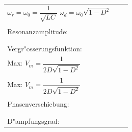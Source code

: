 \begin{tabular}{|p{4cm}|p{7cm}|p{7cm}|}
\begin{minipage}[]{7cm}
\vspace{0.1cm}
$\omega_r=\omega_0=\dfrac{1}{\sqrt{LC}}$ \qquad
$\omega_d=\omega_0\sqrt{1-D^2}
$ \end{minipage}
&
\begin{minipage}[]{7cm}
\vspace{0.2cm}
$\omega_r=\omega_0=\dfrac{1}{\sqrt{LC}}$\\
\end{minipage}\\
\hline
Resonanzamplitude: &
\begin{minipage}[]{7cm}
\vspace{0.1cm}
$I_{0_r}=\dfrac{U_0}{R_S}$\\
\end{minipage}&
\begin{minipage}[]{7cm}
\vspace{0.2cm}
$U_{0_r}=I_0\cdot R_P\qquad$ mit $ R_P =\dfrac{\omega^2\,L^2}{R_S}$\\
\end{minipage}\\
\hline
Vergr"osserungsfunktion: &
\begin{minipage}[]{7cm}
\vspace{0.1cm}
$V(\eta)=\dfrac{\eta^2}{\sqrt{(1-\eta^2)^2+(2D\,\eta)^2}}$\\ Max:
$V_m=\dfrac{1}{2D\sqrt{1-D^2}}$\\
\end{minipage} &
\begin{minipage}[]{7cm}
\vspace{0.2cm}
$V(\eta)=\dfrac{1}{\sqrt{(1-\eta^2)^2+(2D\,\eta)^2}}$\\
Max: $V_m=\dfrac{1}{2D\sqrt{1-D^2}}$\\
\end{minipage}\\
\hline
Phasenverschiebung: &
\begin{minipage}[]{7cm}
\vspace{0.1cm}
$\varphi_{_U}=\arctan\left(\dfrac{2D\,\eta}{1-\eta^2}\right)-\pi$\\
\end{minipage} &
\begin{minipage}[]{7cm}
\vspace{0.2cm}
$\varphi_{_I}=\arctan\left(\dfrac{2D\,\eta}{1-\eta^2}\right)$\\
\end{minipage}\\
\hline
D"ampfungsgrad: &
\begin{minipage}[]{7cm}

\end{minipage}
\end{tabular}

